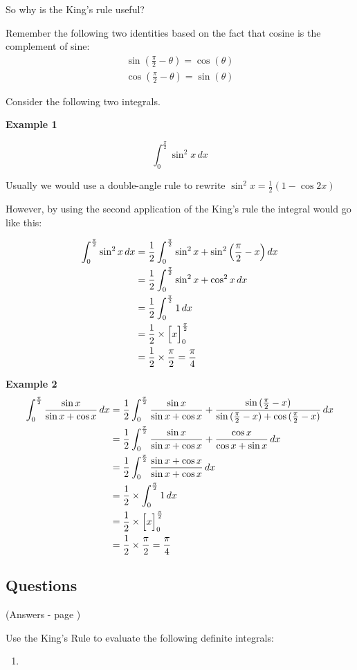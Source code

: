 \documentclass[../main.tex]{subfiles}
\begin{document}
So why is the King's rule useful? 

Remember the following two identities based on the fact that cosine is the complement of sine:
\begin{align*}
    \sin{(\frac{\pi}{2}-\theta)}=\cos{(\theta)}\\
    \cos{(\frac{\pi}{2}-\theta)}=\sin{(\theta)}
\end{align*}

Consider the following two integrals.

\textbf{Example 1}

\[\int_0^{\frac{\pi}{2}} \sin^2{x}\,dx\]

Usually we would use a double-angle rule to rewrite $\sin^2{x}=\frac{1}{2}(1-\cos{2x})$

However, by using the second application of the King's rule the integral would go like this:

\begin{align*}
    \int_0^{\frac{\pi}{2}} \sin^2{x}\,dx &= \frac{1}{2}\int_0^{\frac{\pi}{2}}\sin^2{x}+\sin^2{\Bigl(\frac{\pi}{2}-x\Bigr)}\,dx\\
    &= \frac{1}{2}\int_0^{\frac{\pi}{2}}\sin^2{x}+\cos^2{x}\,dx \\
    &=\frac{1}{2}\int_0^{\frac{\pi}{2}}1\,dx\\
    &=\frac{1}{2}\times \Bigl[x\Bigr]_0^{\frac{\pi}{2}}\\
    &=\frac{1}{2}\times \frac{\pi}{2}=\frac{\pi}{4}
\end{align*}

\textbf{Example 2}
\begin{align*}
    \int_0^{\frac{\pi}{2}} \frac{\sin{x}}{\sin{x}+\cos{x}}\,dx &= \frac{1}{2}\int_0^{\frac{\pi}{2}}\frac{\sin{x}}{\sin{x}+\cos{x}}+\frac{\sin{(\frac{\pi}{2}-x)}}{\sin{(\frac{\pi}{2}-x)}+\cos{(\frac{\pi}{2}-x)}}\,dx\\
    &=\frac{1}{2}\int_0^{\frac{\pi}{2}}\frac{\sin{x}}{\sin{x}+\cos{x}}+\frac{\cos{x}}{\cos{x}+\sin{x}}\,dx\\
    &=\frac{1}{2}\int_0^{\frac{\pi}{2}}\frac{\sin{x}+\cos{x}}{\sin{x}+\cos{x}}\,dx\\
    &=\frac{1}{2}\times \int_0^{\frac{\pi}{2}}1\,dx\\
    &=\frac{1}{2}\times \Bigl[x\Bigr]_0^{\frac{\pi}{2}}\\
    &=\frac{1}{2}\times \frac{\pi}{2}=\frac{\pi}{4}
\end{align*}

\pagebreak
\subsection*{Questions} 
\label{Kings rule}
(Answers - page {\pageref{Kings rule answers}})

Use the King's Rule to evaluate the following definite integrals:

\begin{enumerate}[itemsep=0.7cm]
    \item 
    
\end{enumerate}


\pagebreak
\end{document}
